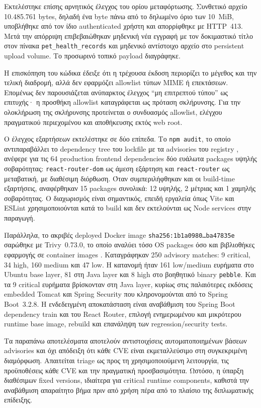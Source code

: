 Εκτελέστηκε επίσης αρνητικός έλεγχος του ορίου μεταφόρτωσης. Συνθετικό αρχείο
10.485.761 bytes, δηλαδή ένα byte πάνω από το δηλωμένο όριο των 10~MiB,
υποβλήθηκε από τον ίδιο authenticated χρήστη και απορρίφθηκε με HTTP~413.
Μετά την απόρριψη επιβεβαιώθηκαν μηδενική νέα εγγραφή με τον δοκιμαστικό τίτλο
στον πίνακα \texttt{pet\_health\_records} και μηδενικό αντίστοιχο αρχείο στο
persistent upload volume. Το προσωρινό τοπικό payload διαγράφηκε.

Η επισκόπηση του κώδικα έδειξε ότι η τρέχουσα έκδοση περιορίζει το μέγεθος και
την τελική διαδρομή, αλλά δεν εφαρμόζει allowlist τύπων MIME ή επεκτάσεων.
Επομένως δεν παρουσιάζεται ανύπαρκτος έλεγχος \enquote{μη επιτρεπτού τύπου}
ως επιτυχής· η προσθήκη allowlist καταγράφεται ως πρόταση σκλήρυνσης. Για την
ολοκλήρωση της σκλήρυνσης προτείνεται ο συνδυασμός allowlist, ελέγχου
πραγματικού περιεχομένου και αποθήκευσης εκτός web root.

Ο έλεγχος εξαρτήσεων εκτελέστηκε σε δύο επίπεδα. Το \texttt{npm audit}, το
οποίο αντιπαραβάλλει το dependency tree του lockfile με τα advisories του
registry \cite{npm2026audit}, ανέφερε για τις 64 production frontend
dependencies δύο ευάλωτα packages υψηλής σοβαρότητας:
\texttt{react-router-dom} ως άμεση εξάρτηση και \texttt{react-router} ως
μεταβατική, με διαθέσιμη διόρθωση. Όταν συμπεριλήφθηκαν και οι build-time
εξαρτήσεις, αναφέρθηκαν 15 packages συνολικά: 12 υψηλής, 2 μέτριας και 1
χαμηλής σοβαρότητας. Ο διαχωρισμός είναι σημαντικός, επειδή εργαλεία όπως
Vite και ESLint χρησιμοποιούνται κατά το build και δεν εκτελούνται ως Node
services στην παραγωγή.

Παράλληλα, το ακριβές deployed Docker image
\texttt{sha256:1b1a0980\ldots ba47835e} σαρώθηκε με Trivy~0.73.0, το οποίο
αναλύει τόσο OS packages όσο και βιβλιοθήκες εφαρμογής σε container images
\cite{aquasecurity2026trivyimage}. Καταγράφηκαν 250 advisory matches: 9
critical, 34 high, 160 medium και 47 low. Η κατανομή ήταν 161 low/medium
ευρήματα στο Ubuntu base layer, 81 στη Java layer και 8 high στο βοηθητικό
binary \texttt{pebble}. Και τα 9 critical ευρήματα βρίσκονταν στη Java layer,
κυρίως στις παλαιότερες εκδόσεις embedded Tomcat και Spring Security που
κληρονομούνται από το Spring Boot~3.2.8. Η ενδεδειγμένη αποκατάσταση είναι
αναβάθμιση του Spring Boot dependency train και του React Router, επιλογή
ενημερωμένου και μικρότερου runtime base image, rebuild και επανάληψη των
regression/security tests.

Τα παραπάνω αποτελέσματα αποτελούν αντιστοιχίσεις αυτοματοποιημένων βάσεων
advisories και όχι απόδειξη ότι κάθε CVE είναι εκμεταλλεύσιμο στη συγκεκριμένη
διαμόρφωση. Απαιτείται triage ως προς τη χρησιμοποιούμενη λειτουργία, τις
προϋποθέσεις κάθε CVE και την πραγματική προσβασιμότητα. Ωστόσο, η ύπαρξη
διαθέσιμων fixed versions, ιδιαίτερα για critical runtime components,
καθιστά την αναβάθμιση απαραίτητο βήμα πριν από χρήση πέρα από το πλαίσιο της
διπλωματικής επίδειξης.

